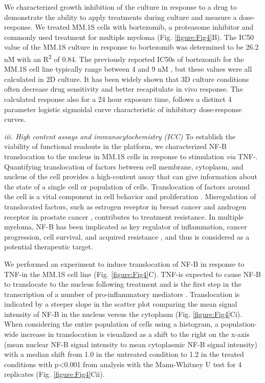We characterized growth inhibition of the culture in response to a drug to demonstrate the ability to apply treatments during culture and measure a dose-response. We treated MM.1S cells with bortezomib, a proteasome inhibitor and commonly used treatment for multiple myeloma (Fig. \ref{figure:Fig4}B). The IC50 value of the MM.1S culture in response to bortezomib was determined to be 26.2 nM with an R\textsuperscript{2} of 0.84. The previously reported IC50s of bortezomib for the MM.1S cell line typically range between 4 and 9 nM \cite{Bianchi2006, Hu2014, Horton2006}, but these values were all calculated in 2D culture. It has been widely shown that 3D culture conditions often decrease drug sensitivity \cite{Tung2011, Friedrich2009}and better recapitulate in vivo response. The calculated response also for a 24 hour exposure time, follows a distinct 4 parameter logistic sigmoidal curve characteristic of inhibitory dose-response curves. 

\textit{iii. High content assays and immunocytochemistry (ICC)} To establish the viability of functional readouts in the platform, we characterized NF-\textkappa B translocation to the nucleus in MM.1S cells in response to stimulation \textit{via} TNF-\textalpha. Quantifying translocation of factors between cell membrane, cytoplasm, and nucleus of the cell provides a high-content assay that can give information about the state of a single cell or population of cells. Translocation of factors around the cell is a vital component in cell behavior and proliferation \cite{Chuderland2008}. Misregulation of translocated factors, such as estrogen receptor in breast cancer \cite{Revankar2005} and androgen receptor in prostate cancer \cite{Molina2011}, contributes to treatment resistance. In multiple myeloma, NF-\textkappa B has been implicated as key regulator of inflammation, cancer progression, cell survival, and acquired resistance \cite{hideshima2000thalidomide}, and thus is considered as a potential therapeutic target. 

We performed an experiment to induce translocation of NF-\textkappa B in response to TNF-\textalpha  in the MM.1S cell line (Fig. \ref{figure:Fig4}C). TNF-\textalpha  is expected to cause NF-\textkappa B to translocate to the nucleus following treatment and is the first step in the transcription of a number of pro-inflammatory mediators \cite{Pahl1999}. Translocation is indicated by a steeper slope in the scatter plot comparing the mean signal intensity of NF-\textkappa B in the nucleus versus the cytoplasm (Fig. \ref{figure:Fig4}Ci). When considering the entire population of cells using a histogram, a population-wide increase in translocation is visualized as a shift to the right on the x-axis (mean nuclear NF-\textkappa B signal intensity to mean cytoplasmic NF-\textkappa B signal intensity) with a median shift from 1.0 in the untreated condition to 1.2 in the treated conditions with p<0.001 from analysis with the Mann-Whitney U test for 4 replicates (Fig. \ref{figure:Fig4}Cii).

